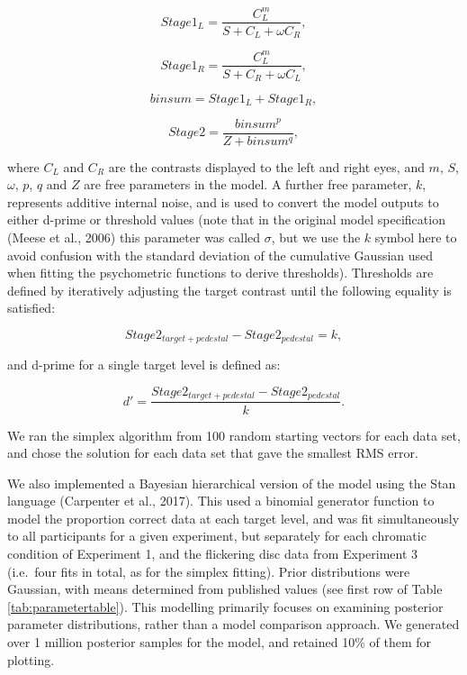 \documentclass[
]{article}
\begin{document}
\begin{equation}
Stage1_L = \frac{C_L^m}{S + C_L + \omega C_R},
\end{equation}

\begin{equation}
Stage1_R = \frac{C_L^m}{S + C_R + \omega C_L},
\end{equation}

\begin{equation}
binsum = Stage1_L + Stage1_R,
\end{equation}

\begin{equation}
Stage2 = \frac{binsum^p}{Z + binsum^q},
\end{equation}

where \(C_L\) and \(C_R\) are the contrasts displayed to the left and right eyes, and \(m\), \(S\), \(\omega\), \(p\), \(q\) and \(Z\) are free parameters in the model. A further free parameter, \(k\), represents additive internal noise, and is used to convert the model outputs to either d-prime or threshold values (note that in the original model specification (Meese et al., 2006) this parameter was called \(\sigma\), but we use the \(k\) symbol here to avoid confusion with the standard deviation of the cumulative Gaussian used when fitting the psychometric functions to derive thresholds). Thresholds are defined by iteratively adjusting the target contrast until the following equality is satisfied:

\begin{equation}
Stage2_{target+pedestal} - Stage2_{pedestal} = k,
\end{equation}

and d-prime for a single target level is defined as:

\begin{equation}
d' = \frac{Stage2_{target+pedestal} - Stage2_{pedestal}}{k}.
\end{equation}

We ran the simplex algorithm from 100 random starting vectors for each data set, and chose the solution for each data set that gave the smallest RMS error.

We also implemented a Bayesian hierarchical version of the model using the Stan language (Carpenter et al., 2017). This used a binomial generator function to model the proportion correct data at each target level, and was fit simultaneously to all participants for a given experiment, but separately for each chromatic condition of Experiment 1, and the flickering disc data from Experiment 3 (i.e.~four fits in total, as for the simplex fitting). Prior distributions were Gaussian, with means determined from published values (see first row of Table \ref{tab:parametertable}). This modelling primarily focuses on examining posterior parameter distributions, rather than a model comparison approach. We generated over 1 million posterior samples for the model, and retained 10\% of them for plotting.
\end{document}

